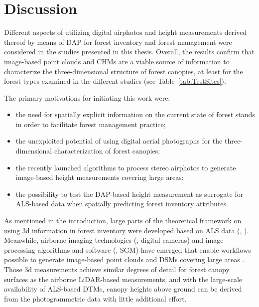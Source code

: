\chapter{Discussion}
\label{chp:Discussion}


Different aspects of utilizing digital airphotos and height measurements derived thereof by means of \ac{DAP} 
for forest inventory and forest management were considered in the studies presented in this thesis.
Overall, the results confirm that image-based point clouds and \acp{CHM} are a viable source of information
to characterize the three-dimensional structure of forest canopies, at least for the forest types examined
in the different studies (see Table~\ref{tab:TestSites}).

The primary motivations for initiating this work were:
\begin{itemize}
	\item the need for spatially explicit information on the current state of forest stands in order to facilitate forest management practice;
	\item the unexploited potential of using digital aerial photographs for the three-dimensional characterization of forest canopies;
	\item the recently launched algorithms to process stereo airphotos to generate image-based height measurements covering large areas;
	\item the possibility to test the \ac{DAP}-based height measurement as surrogate for \ac{ALS}-based data when spatially predicting forest inventory attributes.  
\end{itemize} 


As mentioned in the introduction, large parts of the theoretical framework on using 3d information in forest inventory
were developed based on \ac{ALS} data (\eg, \cite{Naesset.2002b}).
Meanwhile, airborne imaging technologies (\eg, digital cameras) and image processing algorithms and software (\eg, \ac{SGM}) 
have emerged that enable workflows possible to generate image-based point clouds and \acp{DSM} covering large areas \parencite{White.2016}.
Those 3d measurements achieve similar degrees of detail for forest canopy surfaces as the airborne \ac{LiDAR}-based measurements,
and with the large-scale availability of \ac{ALS}-based \acp{DTM}, canopy heights above ground can be derived from 
the photogrammetric data with little additional effort. 

